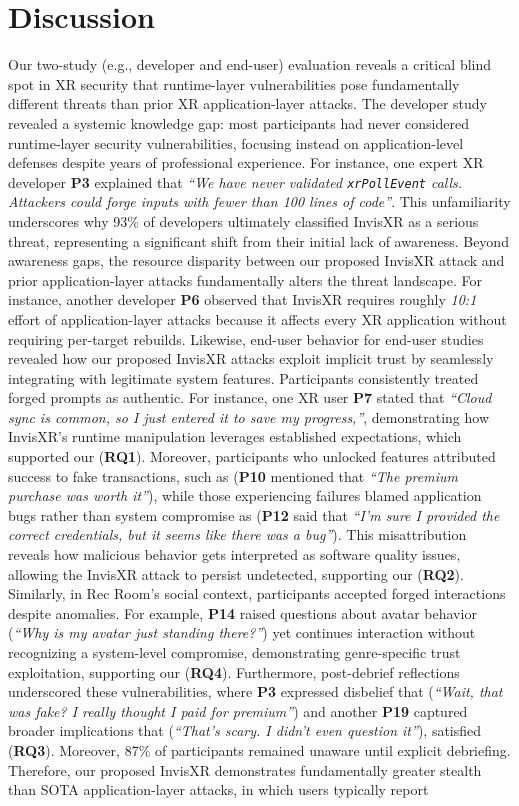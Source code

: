 \documentclass[letterpaper,twocolumn,10pt]{article}
\begin{document}
\section{Discussion}
Our two-study (e.g., developer and end-user) evaluation reveals a critical blind spot in XR security that runtime-layer vulnerabilities pose fundamentally different threats than prior XR application-layer attacks. The developer study revealed a systemic knowledge gap: most participants had never considered runtime-layer security vulnerabilities, focusing instead on application-level defenses despite years of professional experience. For instance, one expert XR developer \textbf{P3} explained that \textit{``We have never validated \texttt{xrPollEvent} calls. Attackers could forge inputs with fewer than 100 lines of code''}. This unfamiliarity underscores why 93\% of developers ultimately classified InvisXR as a serious threat, representing a significant shift from their initial lack of awareness. Beyond awareness gaps, the resource disparity between our proposed  InvisXR attack and prior application-layer attacks fundamentally alters the threat landscape. For instance, another developer \textbf{P6} observed that InvisXR requires roughly \emph{10:1} effort of application-layer attacks because it affects every XR application without requiring per-target rebuilds. Likewise, end-user behavior for end-user studies revealed how our proposed InvisXR attacks exploit implicit trust by seamlessly integrating with legitimate system features. Participants consistently treated forged prompts as authentic. For instance, one XR user \textbf{P7} stated that \textit{``Cloud sync is common, so I just entered it to save my progress,''}, demonstrating how InvisXR’s runtime manipulation leverages established expectations, which supported our (\textbf{RQ1}). Moreover, participants who unlocked features attributed success to fake transactions, such as (\textbf{P10} mentioned that \textit{``The premium purchase was worth it''}), while those experiencing failures blamed application bugs rather than system compromise as (\textbf{P12} said that \textit{``I'm sure I provided the correct credentials, but it seems like there was a bug''}). This misattribution reveals how malicious behavior gets interpreted as software quality issues, allowing the InvisXR attack to persist undetected, supporting our (\textbf{RQ2}). Similarly, in Rec Room's social context, participants accepted forged interactions despite anomalies. For example, \textbf{P14} raised questions about avatar behavior (\textit{``Why is my avatar just standing there?''}) yet continues interaction without recognizing a system-level compromise, demonstrating genre-specific trust exploitation, supporting our (\textbf{RQ4}). Furthermore, post-debrief reflections underscored these vulnerabilities, where \textbf{P3} expressed disbelief that (\textit{``Wait, that was fake? I really thought I paid for premium''}) and another \textbf{P19} captured broader implications that (\textit{``That's scary. I didn't even question it''}), satisfied (\textbf{RQ3}). Moreover, 87\% of participants remained unaware until explicit debriefing. Therefore, our proposed InvisXR demonstrates fundamentally greater stealth than SOTA application-layer attacks, in which users typically report 
\end{document}
